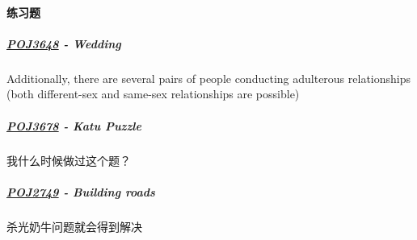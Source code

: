 \documentclass[]{cpp}
\begin{document}
	\paragraph{练习题}
	\subparagraph{\href{http://poj.org/problem?id=3648}{POJ3648} - Wedding}
	Additionally, there are several pairs of people conducting adulterous relationships (both different-sex and same-sex relationships are possible)
	\subparagraph{\href{http://poj.org/problem?id=3678}{POJ3678} - Katu Puzzle}
	我什么时候做过这个题？
	\subparagraph{\href{http://poj.org/problem?id=2749}{POJ2749} - Building roads}
	杀光奶牛问题就会得到解决
\end{document}
